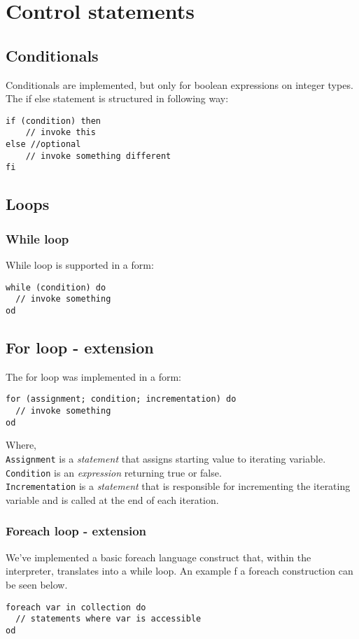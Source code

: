 \documentclass[10pt]{scrartcl}
\begin{document}
\section{Control statements}
\subsection{Conditionals}
Conditionals are implemented, but only for boolean expressions on integer types. The if else statement is structured in following way:
\begin{lstlisting}
if (condition) then
	// invoke this
else //optional
	// invoke something different
fi
\end{lstlisting}
\subsection{Loops}
\subsubsection{While loop}
While loop is supported in a form:
\begin{lstlisting}
while (condition) do
  // invoke something
od
\end{lstlisting}	
\subsection{For loop - extension}
The for loop was implemented in a form:
\begin{lstlisting}
for (assignment; condition; incrementation) do
  // invoke something
od
\end{lstlisting}
Where,\\
\texttt{Assignment} is a \emph{statement} that assigns starting value to iterating variable. \\
\texttt{Condition} is an \emph{expression} returning true or false. \\
\texttt{Incrementation} is a \emph{statement} that is responsible for incrementing the iterating variable and is called at the end of each iteration.
\subsubsection{Foreach loop - extension}
We've implemented a basic foreach language construct that, within the interpreter, translates into a while loop. An example f a foreach construction can be seen below.
  \begin{lstlisting}
foreach var in collection do
  // statements where var is accessible
od
\end{lstlisting}
\end{document}

